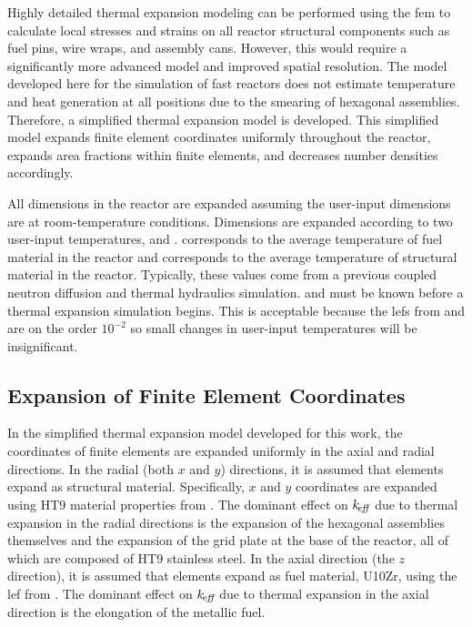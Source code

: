   Highly detailed thermal expansion modeling can be performed using the
  \gls{fem} to calculate local stresses and strains on all reactor
  structural components such as fuel pins, wire wraps, and assembly cans.
  However, this would require a significantly more advanced model and improved
  spatial resolution. The model developed here for the simulation of fast
  reactors does not estimate temperature and heat generation at all positions
  due to the smearing of hexagonal assemblies. Therefore, a simplified thermal
  expansion model is developed.  This simplified model expands finite element
  coordinates uniformly throughout the reactor, expands area fractions within
  finite elements, and decreases number densities accordingly.

  All dimensions in the reactor are expanded assuming the user-input
  dimensions are at room-temperature conditions. Dimensions are expanded
  according to two user-input temperatures, \texpfuel and \texpstruct.
  \texpfuel corresponds to the average temperature of fuel material in the
  reactor and \texpstruct corresponds to the average temperature of structural
  material in the reactor. Typically, these values come from a previous
  coupled neutron diffusion and thermal hydraulics simulation. \texpfuel and
  \texpstruct must be known before a thermal expansion simulation begins. This
  is acceptable because the \glspl{lef} from  and
   are on the order $10^{-2}$ so small changes in
  user-input temperatures will be insignificant.

  \subsection{Expansion of Finite Element Coordinates}
    \label{sec:expansion_of_fe_coordinates}
    In the simplified thermal expansion model developed for this work, the
    coordinates of finite elements are expanded uniformly in the axial and
    radial directions. In the radial (both $x$ and $y$) directions,
    it is assumed that elements expand as structural material. Specifically,
    $x$ and $y$ coordinates are expanded using HT9 material properties from
    . The dominant effect on $k_{\!\mbox{\scriptsize \em eff}}$ due to thermal expansion
    in the radial directions is the expansion of the hexagonal assemblies
    themselves and the expansion of the grid plate at the base of the reactor,
    all of which are composed of HT9 stainless steel. In the axial direction
    (the $z$ direction), it is assumed that elements expand as fuel material,
    U10Zr, using the \gls{lef} from . The dominant effect on
    $k_{\!\mbox{\scriptsize \em eff}}$ due to thermal expansion in the axial direction is the elongation of
    the metallic fuel.

